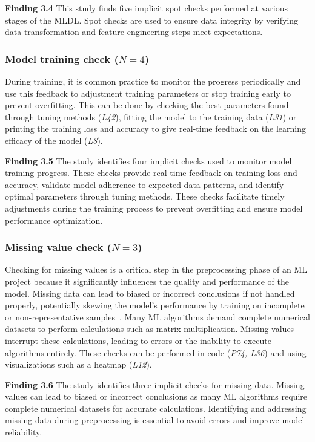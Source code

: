 \documentclass[smallextended]{svjour3}       %
\newcommand{\highlight}[1]{\begin{framed}%
  \noindent#1
\end{framed}}
\begin{document}
\highlight{\textbf{Finding 3.4} This study finds five implicit spot checks performed at various stages of the MLDL. Spot checks are used to ensure data integrity by verifying data transformation and feature engineering steps meet expectations.}

\subsubsection{Model training check ($N = 4$)}

During training, it is common practice to monitor the progress periodically and use this feedback to adjustment training parameters or stop training early to prevent overfitting. This can be done by checking the best parameters found through tuning methods (\emph{L42}), fitting the model to the training data (\emph{L31}) or printing the training loss and accuracy to give real-time feedback on the learning efficacy of the model (\emph{L8}).

\highlight{\textbf{Finding 3.5} The study identifies four implicit checks used to monitor model training progress. These checks provide real-time feedback on training loss and accuracy, validate model adherence to expected data patterns, and identify optimal parameters through tuning methods. These checks facilitate timely adjustments during the training process to prevent overfitting and ensure model performance optimization.}

\subsubsection{Missing value check ($N = 3$)}

Checking for missing values is a critical step in the preprocessing phase of an ML project because it significantly influences the quality and performance of the model. Missing data can lead to biased or incorrect conclusions if not handled properly, potentially skewing the model's performance by training on incomplete or non-representative samples~\citep{shome2022data}. Many ML algorithms demand complete numerical datasets to perform calculations such as matrix multiplication. Missing values interrupt these calculations, leading to errors or the inability to execute algorithms entirely. These checks can be performed in code (\emph{P74, L36}) and using visualizations such as a heatmap (\emph{L12}).

\highlight{\textbf{Finding 3.6} The study identifies three implicit checks for missing data. Missing values can lead to biased or incorrect conclusions as many ML algorithms require complete numerical datasets for accurate calculations. Identifying and addressing missing data during preprocessing is essential to avoid errors and improve model reliability.}
\end{document}
